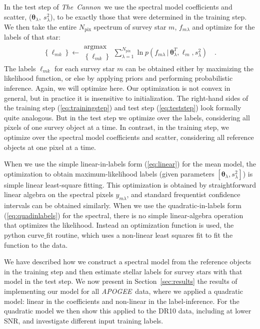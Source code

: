 \documentclass[12pt, preprint]{aastex}
\newcommand{\sectionname}{Section}
\newcommand{\tc}{\textsl{The~Cannon}}
\newcommand{\apogee}{\textsl{APOGEE}}
\newcommand{\set}[1]{\bm{#1}}
\newcommand{\starlabel}{\ell}
\newcommand{\starlabelvec}{\set{\starlabel}}
\newcommand{\given}{\,|\,}
\newcommand{\pix}{\mathrm{pix}}
\begin{document}
In the test step of \tc\ we use the spectral model coefficients and scatter,
($\set{\theta}_\lambda,\ s_\lambda^2$), to be exactly those that were determined in the training step.
We then take the entire $N_\pix$ spectrum of survey star $m$, $f_{m\lambda}$ and optimize for the labels of that star:
\begin{eqnarray}
\left\{\starlabel_{mk}\right\} \leftarrow \substack{\mbox{argmax}\\{\left\{\starlabel_{mk}\right\}}}
\sum_{\lambda=1}^{N_\pix}
\ln p(f_{m\lambda}\given\set{\theta}^T_\lambda, \starlabelvec_m, s_\lambda^2)
\label{eq:teststep}\quad .
\end{eqnarray}
The labels $\starlabel_{mk}$ for each survey star $m$ can be obtained either by maximizing
the likelihood function, or else by applying priors
and performing probabilistic inference.
Again, we will optimize here. Our optimization is not convex in general, but in practice it is insensitive to initialization.
The right-hand sides of the training step (\ref{eq:trainingstep}) and test step (\ref{eq:teststep}) look formally quite analogous.
But in the test step we optimize over the labels, considering all pixels of one survey object at a time. In contrast,
in the training step, we optimize over the spectral model coefficients and scatter, considering all reference objects
at one pixel at a time.

When we use the simple linear-in-labels form (\ref{eq:linear}) for the
mean model, the optimization to obtain maximum-likelihood labels
(given parameters $[\set{\theta}_\lambda, s_\lambda^2]$) is simple linear
least-square fitting.
This optimization is obtained by straightforward linear algebra on the
spectral pixels $y_{m\lambda}$, and standard frequentist confidence
intervals can be obtained similarly.
When we use the quadratic-in-labels form (\ref{eq:quadinlabels}) for the
spectral, there is no simple linear-algebra operation that
optimizes the likelihood. 
Instead an optimization function is used, the python curve$\_$fit routine, which uses a non-linear least squares fit to fit the function to the data. 

We have described how we construct a spectral model from the reference objects in the training step and then 
estimate stellar labels for survey stars with that model in the test step. 
We now present in \sectionname~\ref{sec:results} the results of implementing our model for all \apogee\ data, where we applied a quadratic model: linear in the coefficients and non-linear in the label-inference.  
For the quadratic model we then show this applied to the DR10 data, including at lower SNR, and investigate different input training labels. 
\end{document}
